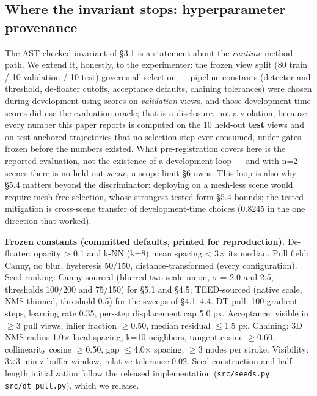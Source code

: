 \subsection{Where the invariant stops: hyperparameter provenance}
The AST-checked invariant of \S3.1 is a statement about the \emph{runtime} method path. We
extend it, honestly, to the experimenter: the frozen view split (80 train / 10 validation
/ 10 test) governs all selection --- pipeline constants (detector and threshold, de-floater
cutoffs, acceptance defaults, chaining tolerances) were chosen during development using
scores on \emph{validation} views, and those development-time scores did use the evaluation
oracle; that is a disclosure, not a violation, because every number this paper reports is
computed on the 10 held-out \textbf{test} views and on test-anchored trajectories that no
selection step ever consumed, under gates frozen before the numbers existed. What
pre-registration covers here is the reported evaluation, not the existence of a
development loop --- and with n=2 scenes there is no held-out \emph{scene}, a scope limit \S6
owns. This loop is also why \S5.4 matters beyond the discriminator: deploying on a
mesh-less scene would require mesh-free selection, whose strongest tested form \S5.4
bounds; the tested mitigation is cross-scene transfer of development-time choices
(0.8245 in the one direction that worked).

\textbf{Frozen constants (committed defaults, printed for reproduction).} De-floater:
opacity > 0.1 and k-NN (k=8) mean spacing < 3$\times$ its median. Pull field: Canny, no blur,
hysteresis 50/150, distance-transformed (every configuration). Seed ranking: Canny-sourced
(blurred two-scale union, $\sigma$ = 2.0 and 2.5, thresholds 100/200 and 75/150) for \S5.1 and \S4.5;
TEED-sourced (native scale, NMS-thinned, threshold 0.5) for the sweeps of \S4.1--4.4. DT
pull: 100 gradient steps, learning rate 0.35, per-step
displacement cap 5.0 px. Acceptance: visible in $\geq$3 pull views, inlier fraction $\geq$0.50,
median residual $\leq$1.5 px. Chaining: 3D NMS radius 1.0$\times$ local spacing, k=10 neighbors,
tangent cosine $\geq$0.60, collinearity cosine $\geq$0.50, gap $\leq$4.0$\times$ spacing, $\geq$3 nodes per stroke.
Visibility: 3$\times$3-min z-buffer window, relative tolerance 0.02. Seed construction and
half-length initialization follow the released implementation (\texttt{src/seeds.py},
\texttt{src/dt\_pull.py}), which we release.

